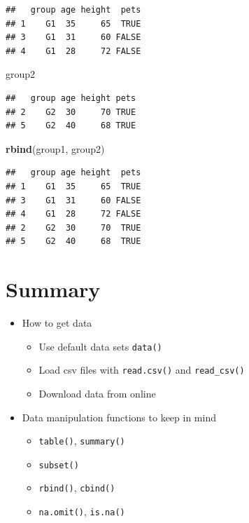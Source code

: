 \documentclass[
]{book}
\newenvironment{Shaded}{\begin{snugshade}}{\end{snugshade}}
\newcommand{\KeywordTok}[1]{\textcolor[rgb]{0.13,0.29,0.53}{\textbf{#1}}}
\newcommand{\NormalTok}[1]{#1}
\providecommand{\tightlist}{%
  \setlength{\itemsep}{0pt}\setlength{\parskip}{0pt}}
\begin{document}
\begin{verbatim}
##   group age height  pets
## 1    G1  35     65  TRUE
## 3    G1  31     60 FALSE
## 4    G1  28     72 FALSE
\end{verbatim}

\begin{Shaded}
\begin{Highlighting}[]
\NormalTok{group2}
\end{Highlighting}
\end{Shaded}

\begin{verbatim}
##   group age height pets
## 2    G2  30     70 TRUE
## 5    G2  40     68 TRUE
\end{verbatim}

\begin{Shaded}
\begin{Highlighting}[]
\KeywordTok{rbind}\NormalTok{(group1, group2)}
\end{Highlighting}
\end{Shaded}

\begin{verbatim}
##   group age height  pets
## 1    G1  35     65  TRUE
## 3    G1  31     60 FALSE
## 4    G1  28     72 FALSE
## 2    G2  30     70  TRUE
## 5    G2  40     68  TRUE
\end{verbatim}

\hypertarget{summary-4}{%
\section*{Summary}\label{summary-4}}

\begin{itemize}
\tightlist
\item
  How to get data

  \begin{itemize}
  \tightlist
  \item
    Use default data sets \texttt{data()}
  \item
    Load csv files with \texttt{read.csv()} and \texttt{read\_csv()}
  \item
    Download data from online
  \end{itemize}
\item
  Data manipulation functions to keep in mind

  \begin{itemize}
  \tightlist
  \item
    \texttt{table()}, \texttt{summary()}
  \item
    \texttt{subset()}
  \item
    \texttt{rbind()}, \texttt{cbind()}
  \item
    \texttt{na.omit()}, \texttt{is.na()}
  \end{itemize}
\end{itemize}
\end{document}
